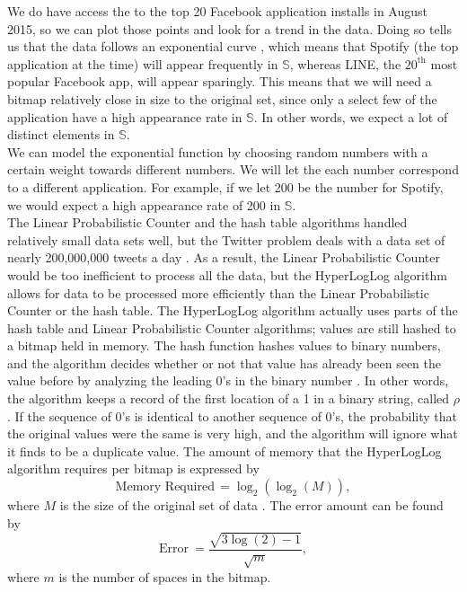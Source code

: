 \documentclass{article}
\begin{document}
We do have access the to the top 20 Facebook application installs in August 2015, so we can plot those points and look for a trend in the data.
Doing so tells us that the data follows an exponential curve \cite{Facebook-2}, which means that Spotify (the top application at the time) will appear frequently in $\mathbb{S}$, whereas LINE, the $20^{\text{th}}$ most popular Facebook app, will appear sparingly.
This means that we will need a bitmap relatively close in size to the original set, since only a select few of the application have a high appearance rate in $\mathbb{S}$.
In other words, we expect a lot of distinct elements in $\mathbb{S}$.\\
\indent We can model the exponential function by choosing random numbers with a certain weight towards different numbers.
We will let the each number correspond to a different application.
For example, if we let 200 be the number for Spotify, we would expect a high appearance rate of 200 in $\mathbb{S}$.\\
\indent The Linear Probabilistic Counter and the hash table algorithms handled relatively small data sets well, but the Twitter problem deals with a data set of nearly 200,000,000 tweets a day \cite{Twitter-2}.
As a result, the Linear Probabilistic Counter would be too inefficient to process all the data, but the HyperLogLog algorithm allows for data to be processed more efficiently than the Linear Probabilistic Counter or the hash table. 
The HyperLogLog algorithm actually uses parts of the hash table and Linear Probabilistic Counter algorithms; values are still hashed to a bitmap held in memory. 
The hash function hashes values to binary numbers, and the algorithm decides whether or not that value has already been seen the value before by analyzing the leading 0's in the binary number \cite[pp. 685, 689]{Heule}.
In other words, the algorithm keeps a record of the first location of a 1 in a binary string, called $\rho$ \cite[pp. 130]{Flaj}.
If the sequence of 0's is identical to another sequence of 0's, the probability that the original values were the same is very high, and the algorithm will ignore what it finds to be a duplicate value. 
The amount of memory that the HyperLogLog algorithm requires per bitmap is expressed by
\[
\text{Memory Required}\, = \log_{2}{\left(\log_{2}{\left(M \right)}\right)},
\]
where $M$ is the size of the original set of data \cite[pp. 129]{Flaj}.
The error amount can be found by
\[
\text{Error}\ = \frac{\sqrt{3\log{(2)} - 1}}{\sqrt{m}},
\]
where $m$ is the number of spaces in the bitmap.
\end{document}
